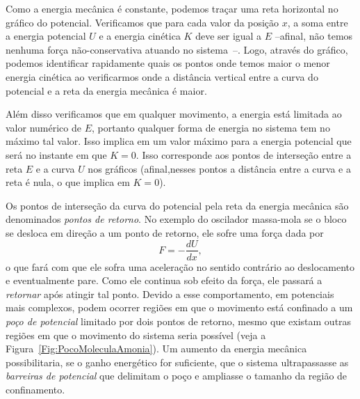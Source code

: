 Como a energia mecânica é constante, podemos traçar uma reta horizontal no gráfico do potencial. Verificamos que para cada valor da posição $x$, a soma entre a energia potencial $U$ e a energia cinética $K$ deve ser igual a $E$ --afinal, não temos nenhuma força não-conservativa atuando no sistema~--. Logo, através do gráfico, podemos identificar rapidamente quais os pontos onde temos maior o menor energia cinética ao verificarmos onde a distância vertical entre a curva do potencial e a reta da energia mecânica é maior.

Além disso verificamos que em qualquer movimento, a energia está limitada ao valor numérico de $E$, portanto qualquer forma de energia no sistema tem no máximo tal valor. Isso implica em um valor máximo para a energia potencial que será no instante em que $K = 0$. Isso corresponde aos pontos de interseção entre a reta $E$ e a curva $U$ nos gráficos (afinal,nesses pontos a distância entre a curva e a reta é nula, o que implica em $K=0$).

Os pontos de interseção da curva do potencial pela reta da energia mecânica são denominados \emph{pontos de retorno}. No exemplo do oscilador massa-mola se o bloco se desloca em direção a um ponto de retorno, ele sofre uma força dada por
\begin{equation*}
  F = -\frac{dU}{dx},
\end{equation*}
%
o que fará com que ele sofra uma aceleração no sentido contrário ao deslocamento e eventualmente pare. Como ele continua sob efeito da força, ele passará a \emph{retornar} após atingir tal ponto. Devido a esse comportamento, em potenciais mais complexos, podem ocorrer regiões em que o movimento está confinado a um \emph{poço de potencial} limitado por dois pontos de retorno, mesmo que existam outras regiões em que o movimento do sistema seria possível (veja a Figura~\ref{Fig:PocoMoleculaAmonia}). Um aumento da energia mecânica possibilitaria, se o ganho energético for suficiente, que o sistema ultrapassasse as \emph{barreiras de potencial} que delimitam o poço e ampliasse o tamanho da região de confinamento.

